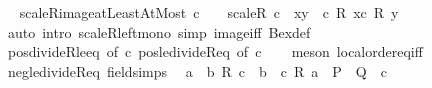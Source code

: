 \begin{isabellebody}
\endisatagproof
{\isafoldproof}%
%
\isadelimproof
\ \isanewline
%
\endisadelimproof
\isanewline
{}\isamarkupfalse%
\ scaleR{\isacharunderscore}{\kern0pt}image{\isacharunderscore}{\kern0pt}atLeastAtMost{\isacharcolon}{\kern0pt}\ {\isachardoublequoteopen}c\ {\isachargreater}{\kern0pt}\ {}\ {\isasymLongrightarrow}\ scaleR\ c\ {\isacharbackquote}{\kern0pt}\ {\isacharbraceleft}{\kern0pt}x{\isachardot}{\kern0pt}{\isachardot}{\kern0pt}y{\isacharbraceright}{\kern0pt}\ {\isacharequal}{\kern0pt}\ {\isacharbraceleft}{\kern0pt}c\ {\isacharasterisk}{\kern0pt}\isactrlsub R\ x{\isachardot}{\kern0pt}{\isachardot}{\kern0pt}c\ {\isacharasterisk}{\kern0pt}\isactrlsub R\ y{\isacharbraceright}{\kern0pt}{\isachardoublequoteclose}\isanewline
%
\isadelimproof
\ \ %
\endisadelimproof
%
\isatagproof
{}\isamarkupfalse%
\ {\isacharparenleft}{\kern0pt}auto\ intro{\isacharbang}{\kern0pt}{\isacharcolon}{\kern0pt}\ scaleR{\isacharunderscore}{\kern0pt}left{\isacharunderscore}{\kern0pt}mono\ simp{\isacharcolon}{\kern0pt}\ image{\isacharunderscore}{\kern0pt}iff\ Bex{\isacharunderscore}{\kern0pt}def{\isacharparenright}{\kern0pt}\isanewline
\ \ \isamarkupfalse%
\ pos{\isacharunderscore}{\kern0pt}divideR{\isacharunderscore}{\kern0pt}le{\isacharunderscore}{\kern0pt}eq\ {\isacharbrackleft}{\kern0pt}of\ c{\isacharbrackright}{\kern0pt}\ pos{\isacharunderscore}{\kern0pt}le{\isacharunderscore}{\kern0pt}divideR{\isacharunderscore}{\kern0pt}eq\ {\isacharbrackleft}{\kern0pt}of\ c{\isacharbrackright}{\kern0pt}\isanewline
\ \ \isamarkupfalse%
\ {\isacharparenleft}{\kern0pt}meson\ local{\isachardot}{\kern0pt}order{\isacharunderscore}{\kern0pt}eq{\isacharunderscore}{\kern0pt}iff{\isacharparenright}{\kern0pt}\ \isanewline
\ \ \isamarkupfalse%
%
\endisatagproof
{\isafoldproof}%
%
\isadelimproof
\isanewline
%
\endisadelimproof
\isanewline
{}\isamarkupfalse%
\isanewline
\isanewline
{}\isamarkupfalse%
\ neg{\isacharunderscore}{\kern0pt}le{\isacharunderscore}{\kern0pt}divideR{\isacharunderscore}{\kern0pt}eq\ {\isacharbrackleft}{\kern0pt}field{\isacharunderscore}{\kern0pt}simps{\isacharbrackright}{\kern0pt}{\isacharcolon}{\kern0pt}\isanewline
\ \ {\isachardoublequoteopen}a\ {\isasymle}\ b\ {\isacharslash}{\kern0pt}\isactrlsub R\ c\ {\isasymlongleftrightarrow}\ b\ {\isasymle}\ c\ {\isacharasterisk}{\kern0pt}\isactrlsub R\ a{\isachardoublequoteclose}\ {\isacharparenleft}{\kern0pt}\ {\isachardoublequoteopen}{\isacharquery}{\kern0pt}P\ {\isasymlongleftrightarrow}\ {\isacharquery}{\kern0pt}Q{\isachardoublequoteclose}{\isacharparenright}{\kern0pt}\ \ {\isachardoublequoteopen}c\ {\isacharless}{\kern0pt}\ {}{\isachardoublequoteclose}\isanewline

\end{isabellebody}
